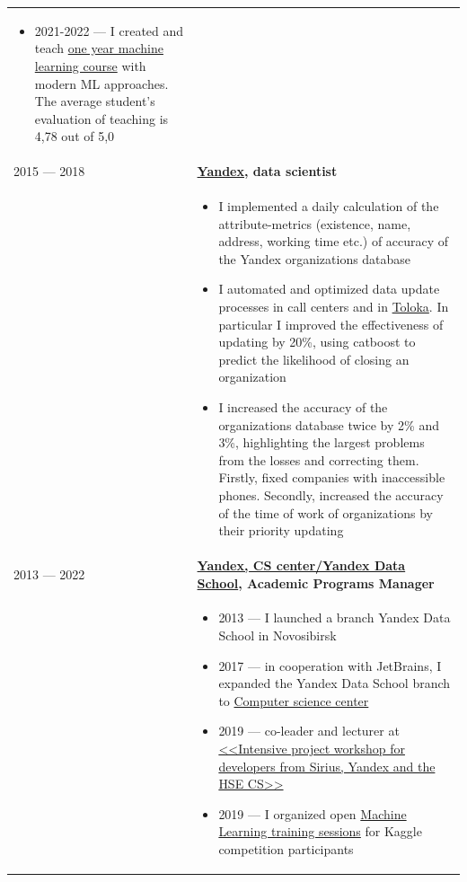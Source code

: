 \documentclass[11pt]{article}
\begin{document}
\begin{longtable} {l | p{}}
\begin{itemize}
	\item 2021-2022 — I created and teach \href{https://github.com/spbu-math-cs/ml-course/}{one year machine learning course} with modern ML approaches. The average student's evaluation of teaching is 4,78 out of 5,0
\end{itemize} \\
2015 — 2018 & {\textbf{\href{https://ya.ru/}{Yandex}, data scientist}} \\
& \vspace{-1.5em} \begin{itemize}
	\item I implemented a daily calculation of the attribute-metrics (existence, name, address, working time etc.) of accuracy of the Yandex organizations database
	\item I automated and optimized data update processes in call centers and in \href{https://toloka.ai/}{Toloka}. In particular I improved the effectiveness of updating by 20\%, using catboost to predict the likelihood of closing an organization
	\item I increased the accuracy of the organizations database twice by 2\% and 3\%, highlighting the largest problems from the losses and correcting them. Firstly, fixed companies with inaccessible phones. Secondly, increased the accuracy of the time of work of organizations by their priority updating
\end{itemize}
\\
2013 — 2022 & {\textbf{\href{https://academy.yandex.ru/dataschool/}{Yandex, CS center/Yandex Data School}, Academic Programs Manager}} \\
& \vspace{-1.5em} \begin{itemize}
	\item 2013 — I launched a branch Yandex Data School in Novosibirsk
	\item 2017 — in cooperation with JetBrains, I expanded the Yandex Data School branch to \href{https://compscicenter.ru}{Computer science center}
	\item 2019 — co-leader and lecturer at \href{https://sochisirius.ru/obuchenie/graduates/smena240/1174}{<<Intensive project workshop for developers from Sirius, Yandex and the HSE CS>>}
	\item 2019 — I organized open \href{https://habr.com/ru/company/JetBrains-education/blog/458042/}{Machine Learning training sessions} for Kaggle competition participants
\end{itemize}
\\

\end{longtable}
\end{document}
